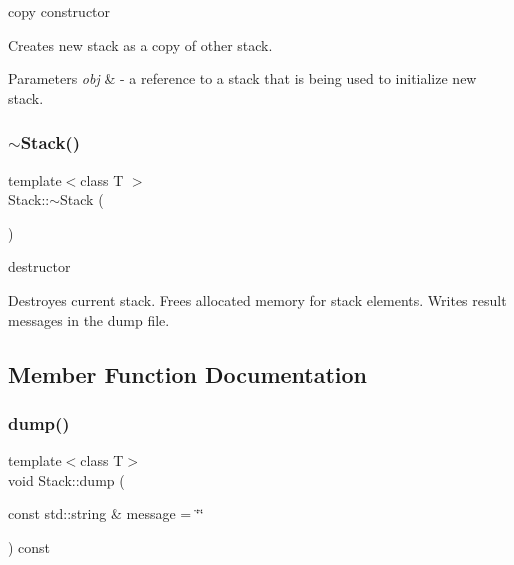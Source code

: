 copy constructor 

Creates new stack as a copy of other stack.


\begin{DoxyParams}{Parameters}
{\em obj} & -\/ a reference to a stack that is being used to initialize new stack. \\
\hline
\end{DoxyParams}
\mbox{\label{class_my_namespace_1_1_stack_a40bd5dff912f0e5290777c4b46d17809}} 
\subsubsection{\texorpdfstring{$\sim$\+Stack()}{~Stack()}}
{\footnotesize\ttfamily template$<$class T $>$ \\
Stack\+::$\sim$\+Stack (\begin{DoxyParamCaption}{ }\end{DoxyParamCaption})}



destructor 

Destroyes current stack. Frees allocated memory for stack elements. Writes result messages in the dump file. 

\subsection{Member Function Documentation}
\mbox{\label{class_my_namespace_1_1_stack_a83672fc8b95f37236f3c40354abb6b79}} 
\subsubsection{\texorpdfstring{dump()}{dump()}}
{\footnotesize\ttfamily template$<$class T$>$ \\
void Stack\+::dump (\begin{DoxyParamCaption}\item[{const std\+::string \&}]{message = {\ttfamily \char`\"{}\char`\"{}} }\end{DoxyParamCaption}) const\hspace{0.3cm}{\ttfamily [private]}}



